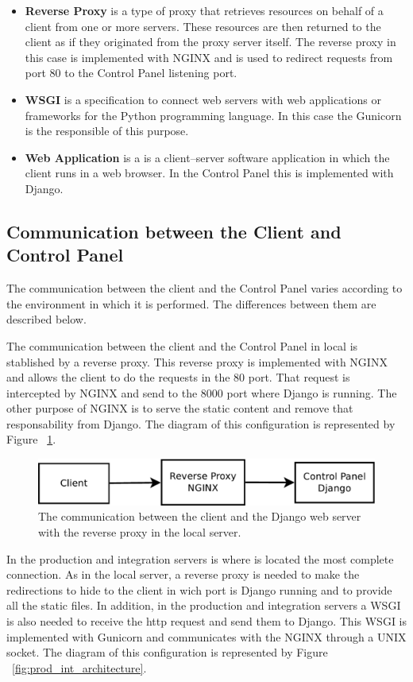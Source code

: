\documentclass[a4paper,12pt]{article}
\begin{document}
\begin{itemize}
\item \textbf{Reverse Proxy} is a type of proxy that retrieves resources on behalf of a client from one or more servers. 
These resources are then returned to the client as if they originated from the proxy server itself. The reverse proxy in this case is 
implemented with NGINX and is used to redirect requests from port 80 to the Control Panel listening port.
\item \textbf{WSGI} is a specification to connect web servers with web applications or frameworks for the Python programming language. 
In this case the Gunicorn is the responsible of this purpose.
\item \textbf{Web Application} is a is a client–server software application in which the client runs in a web browser. In the Control Panel this 
is implemented with Django.
\end{itemize}

\subsection{Communication between the Client and Control Panel}
The communication between the client and the Control Panel varies according to the environment in which it is performed.  
The differences between them are described below.

The communication between the client and the Control Panel in local is stablished by a reverse proxy. This reverse proxy is implemented with
NGINX and allows the client to do the requests in the 80 port. That request is intercepted by NGINX and send to the 8000
port where Django is running. The other purpose of NGINX is to serve the static content and remove that responsability from Django.
The diagram of this configuration is represented by Figure ~\ref{fig:local_architecture}.

\begin{figure}[!ht]
\centering
\includegraphics[width=0.7\columnwidth]{images/local}
\caption{The communication between the client and the Django web server with the reverse proxy in the local server.}
\label{fig:local_architecture}
\end{figure}

In the production and integration servers is where is located the most complete connection. As in the local server, a reverse proxy is needed to 
make the redirections to hide to the client in wich port is Django running and to provide all the static files. In addition, in the production 
and integration servers a WSGI is also needed to receive the http request and send them to Django. This WSGI is implemented with Gunicorn and 
communicates with the NGINX through a UNIX socket. The diagram of this configuration is represented by Figure ~\ref{fig:prod_int_architecture}.
\end{document}
